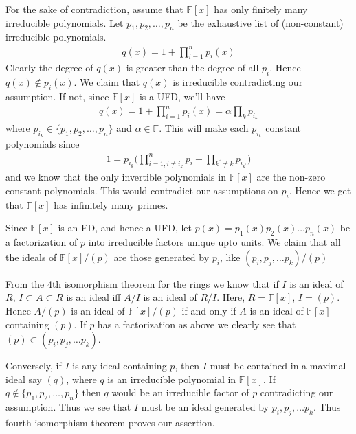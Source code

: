 \documentclass[12pt]{exam}
\theoremstyle{plain} %
\theoremstyle{definition} %
\theoremstyle{remark} %
\begin{document}
\begin{questions}
\begin{solution}
    For the sake of contradiction, assume that $\mathbb{F}[x]$ has
    only finitely many irreducible polynomials. Let $p_1 , p_2 ,
    \ldots , p_n$ be the exhaustive list of (non-constant)
    irreducible polynomials.
    \begin{align*}
      q(x) = 1 +  \prod_{i = 1}^{n} p_i(x)
    \end{align*}
    Clearly the degree of $q(x)$ is greater than the degree of all
    $p_i$. Hence $q(x) \not\in p_i(x)$. We claim that $q(x)$ is
    irreducible contradicting our assumption. If not, since
    $\mathbb{F}[x]$ is a UFD, we'll have
    \begin{align*}
      q(x) = 1 +  \prod_{i = 1}^{n} p_i(x)= \alpha \prod_{k} p_{i_k}
    \end{align*}
    where $p_{i_k} \in \{ p_1 , p_2 , \ldots , p_n \}$ and $\alpha
    \in \mathbb{F}$. This will make each $p_{i_k}$ constant polynomials since
    \begin{align*}
      1 = p_{i_k} \Big(\prod_{i = 1, i \neq i_k}^{n} p_i -
      \prod_{k^\prime \neq k} p_{i_{k^\prime}}\Big)
    \end{align*}
    and we know that the only invertible polynomials in
    $\mathbb{F}[x]$ are the non-zero constant polynomials. This would
    contradict our assumptions on $p_i$. Hence we get that
    $\mathbb{F}[x]$ has infinitely many primes.
  \end{solution}

  \question
  \begin{solution}
    Since $\mathbb{F}[x]$ is an ED, and hence a UFD, let $p(x) =
    p_1(x)p_2(x)\ldots p_n(x)$ be a factorization of $p$
    into irreducible factors unique upto units. We claim that all the ideals of
    $\mathbb{F}[x]/(p)$ are those generated by $p_i$, like
    $(p_i , p_j, \ldots p_k)/(p)$

    From the 4th isomorphism theorem for the rings we know that if
    $I$ is an ideal of $R$, $I \subset A \subset R$ is an ideal iff
    $A/I$ is an ideal of $R/I$. Here, $R = \mathbb{F}[x]$, $I = (p)$.
    Hence $A/(p)$ is an ideal of $\mathbb{F}[x]/(p)$ if and only if
    $A$ is an ideal of $\mathbb{F}[x]$ containing $(p)$. If $p$ has a
    factorization as above we clearly see that $(p) \subset (p_i,
    p_j, \ldots p_k)$.

    Conversely, if $I$ is any ideal containing $p$, then $I$ must be
    contained in a maximal ideal say $(q)$, where $q$ is an
    irreducible polynomial in $\mathbb{F}[x]$. If $q \not\in \{ p_1,
    p_2 , \ldots , p_n \}$ then $q$ would be an irreducible factor of
    $p$ contradicting our assumption. Thus we see that $I$ must be an
    ideal generated by $p_i, p_j, \ldots p_k$. Thus fourth
    isomorphism theorem proves our assertion.
  \end{solution}


\end{questions}
\end{document}
